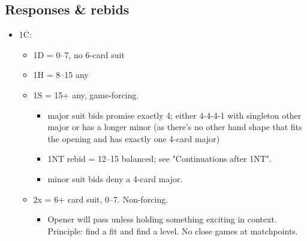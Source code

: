 \documentclass[a4paper,12pt]{article}
\begin{document}
\newpage 

\subsection{Responses \& rebids}

\begin{itemize}
\item 1C:
	\begin{itemize}
   \item 1D = 0--7, no 6-card suit
   \item 1H = 8--15 any
   \item 1S = 15+ any, game-forcing.
		\begin{itemize}
      \item major suit bids promise exactly 4; either 4-4-4-1 with singleton other
         major or has a longer minor (as there's no other hand shape that fits the
         opening and has exactly one 4-card major)
      \item 1NT rebid = 12--15 balanced; see "Continuations after 1NT".
      \item minor suit bids deny a 4-card major.
		\end{itemize}
   \item 2x = 6+ card suit, 0--7. Non-forcing.
		\begin{itemize}
      \item Opener will pass unless holding something exciting in context.
         Principle: find a fit and find a level. No close games at matchpoints.
		\end{itemize}
	\end{itemize}


\end{itemize}
\end{document}
